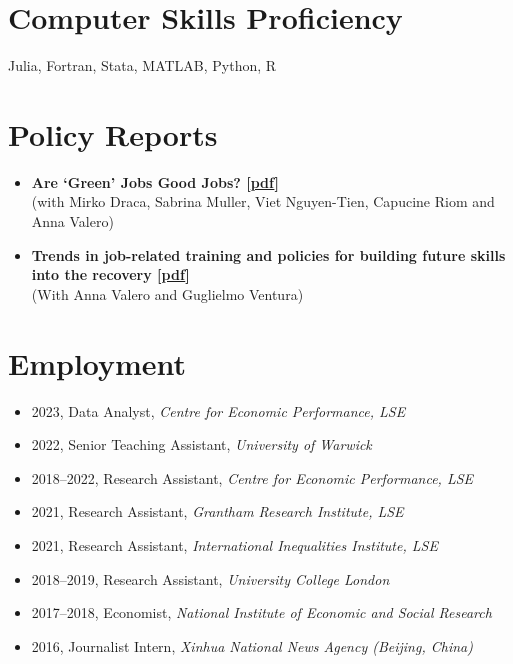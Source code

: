 \documentclass[11pt,a4paper]{article}
\newcommand{\cvitem}[2]{
    \item \textbf{#1} \\ #2
}
\begin{document}
\section{Computer Skills Proficiency}
\noindent Julia, Fortran, Stata, MATLAB, Python, R

\section{Policy Reports}
\begin{itemize}[leftmargin=*, itemsep=0.3em]
    \cvitem{Are ‘Green’ Jobs Good Jobs? [\href{https://www.lse.ac.uk/granthaminstitute/wp-content/uploads/2021/05/Are-Green-Jobs-Good-Jobs.pdf}{pdf}]}{(with Mirko Draca, Sabrina Muller, Viet Nguyen-Tien, Capucine Riom and Anna Valero)}
    \cvitem{Trends in job-related training and policies for building future skills into the recovery [\href{https://www.lse.ac.uk/granthaminstitute/wp-content/uploads/2021/01/Trends-in-job-related-training-and-policies-for-building-future-skills-into-the-recovery_final.pdf}{pdf}]}{(With Anna Valero and Guglielmo Ventura)}
\end{itemize}

\section{Employment}
\begin{itemize}[leftmargin=*, itemsep=0.2em]
    \item 2023, Data Analyst, \textit{Centre for Economic Performance, LSE}
    \item 2022, Senior Teaching Assistant, \textit{University of Warwick}
    \item 2018–2022, Research Assistant, \textit{Centre for Economic Performance, LSE}
    \item 2021, Research Assistant, \textit{Grantham Research Institute, LSE}
    \item 2021, Research Assistant, \textit{International Inequalities Institute, LSE}
    \item 2018–2019, Research Assistant, \textit{University College London}
    \item 2017–2018, Economist, \textit{National Institute of Economic and Social Research}
    \item 2016, Journalist Intern, \textit{Xinhua National News Agency (Beijing, China)}
\end{itemize}
\end{document}

